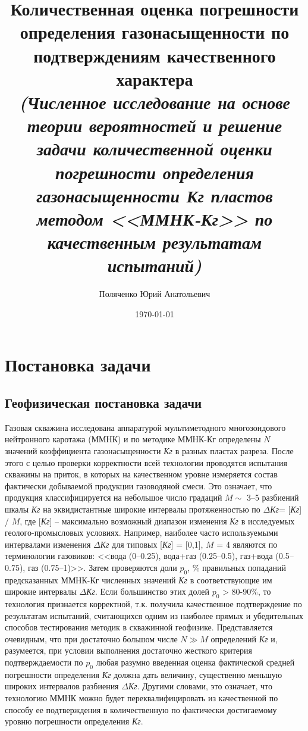 \documentclass[a4paper,12pt]{article} %
\author{Поляченко Юрий Анатольевич}
\title{Количественная оценка погрешности определения газонасыщенности по подтверждениям качественного характера \\ \emph{\small (Численное исследование на основе теории вероятностей и решение задачи количественной оценки погрешности определения газонасыщенности Кг пластов методом <<ММНК-Кг>> по качественным результатам испытаний)}}
\date{\today}
\begin{document}

\clearpage\maketitle
\thispagestyle{empty}

\newpage

\tableofcontents

\newpage

\section{Постановка задачи}

\subsection{Геофизическая постановка задачи}

Газовая скважина исследована аппаратурой мультиметодного многозондового нейтронного каротажа (ММНК) и по методике ММНК-Кг определены $N$ значений коэффициента газонасыщенности \emph{Кг} в разных пластах разреза. После этого  с целью проверки корректности всей технологии проводятся испытания скважины на приток, в которых на качественном уровне измеряется состав фактически добываемой продукции газоводяной смеси. Это означает, что продукция классифицируется на небольшое число градаций $M \sim$ 3--5 разбиений шкалы \emph{Кг} на эквидистантные широкие интервалы протяженностью по $\Delta$\emph{Кг}= [\emph{Кг}] / $M$, где [\emph{Кг}] – максимально возможный диапазон изменения \emph{Кг} в исследуемых геолого-промысловых условиях. Например, наиболее часто используемыми интервалами изменения $\Delta$\emph{Кг} для типовых [\emph{Кг}] = [0,1], $M$ = 4 являются по терминологии газовиков:  <<вода (0--0.25), вода+газ (0.25--0.5), газ+вода (0.5--0.75), газ (0.75--1)>>. Затем проверяются доли $p_0$, \% правильных попаданий предсказанных ММНК-Кг численных значений \emph{Кг} в соответствующие им широкие интервалы $\Delta$\emph{Кг}. Если большинство этих долей $p_0$ > 80-90\%, то технология признается корректной, т.к. получила качественное подтверждение по результатам испытаний, считающихся одним из наиболее прямых и убедительных способов тестирования методик в скважинной геофизике.
Представляется очевидным, что при достаточно большом числе $N \gg M$ определений \emph{Кг} и, разумеется, при условии выполнения достаточно жесткого критерия подтверждаемости по $p_0$ любая разумно введенная оценка фактической средней погрешности определения \emph{Кг}   должна дать величину, существенно меньшую широких интервалов разбиения $\Delta$\emph{Кг}. Другими словами, это означает, что технологию ММНК можно будет переквалифицировать из качественной по способу ее подтверждения в количественную по фактически достигаемому уровню погрешности определения \emph{Кг}. 
\end{document}
